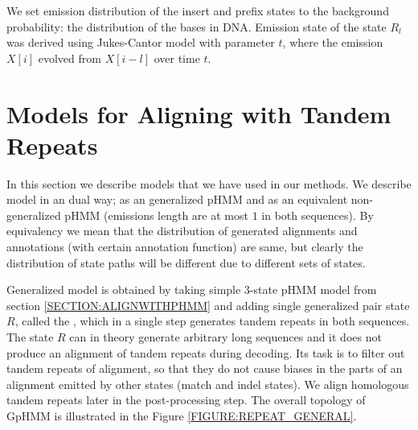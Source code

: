 We set emission distribution of the insert and prefix states to the background
probability: the distribution of the bases in DNA. Emission state of the state
$R_l$ was derived using Jukes-Cantor model with parameter $t$, where the
emission $X[i]$ evolved from $X[i-l]$ over time $t$.

\section{Models for Aligning with Tandem Repeats}\label{SECTION:REPMODELS} In
this section we describe models that we have used in our methods. We describe
model in an dual way; as an generalized pHMM and as an equivalent
non-generalized pHMM (emissions length are at most $1$ in both sequences). By
equivalency we mean that the distribution of generated alignments and
annotations (with certain annotation function) are same, but clearly the
distribution of state paths will be different due to different sets of states.

Generalized model is obtained by taking simple 3-state pHMM model from section
\ref{SECTION:ALIGNWITHPHMM} and adding single generalized pair state $R$,
called the , which in a single step generates tandem
repeats in both sequences. The state $R$ can in theory generate arbitrary long
sequences and it does not produce an alignment of tandem repeats during
decoding. Its task is to filter out tandem repeats of alignment, so that they
do not cause biases in the parts of an alignment emitted by other states (match
and indel states). We align homologous tandem repeats later in the
post-processing step. The overall topology of GpHMM is illustrated in the
Figure \ref{FIGURE:REPEAT_GENERAL}.


